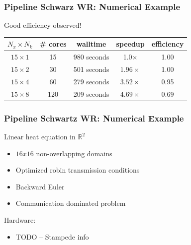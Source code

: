 \documentclass{beamer}
\begin{document}
\begin{frame}
  \frametitle{Pipeline Schwarz WR: Numerical Example}
  Good efficiency observed!
  \begin{center}
  \begin{tabular}{c|c|c|c|c}
    $N_x\times N_k$ &
    \# cores & walltime & speedup & efficiency\\
    \hline
    $15 \times 1 $&
    15 &
    980 seconds& 
    1.0$\times$ & 
    1.00 
    \\
    $15 \times 2 $&
    30 &
    501 seconds &
    $1.96\times$ &
    1.00
    \\
    $15 \times 4 $&
    60 &
    279 seconds &
    $3.52\times$ &
    0.95
    \\
    $15 \times 8 $&
    120 &
    209 seconds &
    $4.69\times$ &
    0.69
  \end{tabular}
  \end{center}

\end{frame}

\begin{frame}
  \frametitle{Pipeline Schwartz WR: Numerical Example}

  Linear heat equation in $\mathbb{R}^2$
  \begin{itemize}
  \item $16x16$ non-overlapping domains
  \item Optimized robin transmission conditions
  \item Backward Euler
  \item Communication dominated problem
  \end{itemize}

  \vspace*{0.1in}
  Hardware:
  \begin{itemize}
  \item TODO -- Stampede info
  \end{itemize}
\end{frame}
\end{document}
